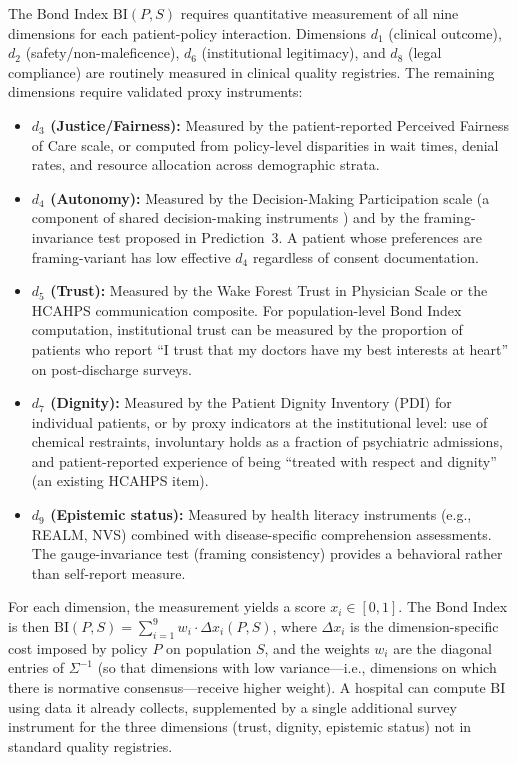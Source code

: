 \documentclass[12pt]{article}
\theoremstyle{definition}
\theoremstyle{remark}
\newcommand{\BI}{\mathrm{BI}}              %
\begin{document}
The Bond Index $\BI(P, S)$ requires quantitative measurement of all nine dimensions for each patient-policy interaction.  Dimensions $d_1$ (clinical outcome), $d_2$ (safety/non-maleficence), $d_6$ (institutional legitimacy), and $d_8$ (legal compliance) are routinely measured in clinical quality registries.  The remaining dimensions require validated proxy instruments:

\begin{itemize}
    \item \textbf{$d_3$ (Justice/Fairness):}  Measured by the patient-reported Perceived Fairness of Care scale, or computed from policy-level disparities in wait times, denial rates, and resource allocation across demographic strata.

    \item \textbf{$d_4$ (Autonomy):}  Measured by the Decision-Making Participation scale (a component of shared decision-making instruments \cite{elwyn2012}) and by the framing-invariance test proposed in Prediction~3.  A patient whose preferences are framing-variant has low effective $d_4$ regardless of consent documentation.

    \item \textbf{$d_5$ (Trust):}  Measured by the Wake Forest Trust in Physician Scale or the HCAHPS communication composite.  For population-level Bond Index computation, institutional trust can be measured by the proportion of patients who report ``I trust that my doctors have my best interests at heart'' on post-discharge surveys.

    \item \textbf{$d_7$ (Dignity):}  Measured by the Patient Dignity Inventory (PDI) \cite{chochinov2008} for individual patients, or by proxy indicators at the institutional level: use of chemical restraints, involuntary holds as a fraction of psychiatric admissions, and patient-reported experience of being ``treated with respect and dignity'' (an existing HCAHPS item).

    \item \textbf{$d_9$ (Epistemic status):}  Measured by health literacy instruments (e.g., REALM, NVS) combined with disease-specific comprehension assessments.  The gauge-invariance test (framing consistency) provides a behavioral rather than self-report measure.
\end{itemize}

For each dimension, the measurement yields a score $x_i \in [0, 1]$.  The Bond Index is then $\BI(P, S) = \sum_{i=1}^{9} w_i \cdot \Delta x_i(P, S)$, where $\Delta x_i$ is the dimension-specific cost imposed by policy $P$ on population $S$, and the weights $w_i$ are the diagonal entries of $\Sigma^{-1}$ (so that dimensions with low variance---i.e., dimensions on which there is normative consensus---receive higher weight).  A hospital can compute $\BI$ using data it already collects, supplemented by a single additional survey instrument for the three dimensions (trust, dignity, epistemic status) not in standard quality registries.
\end{document}
